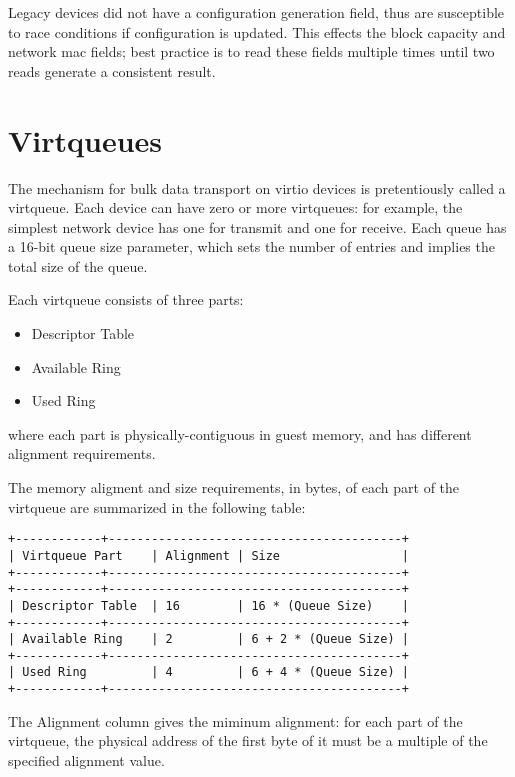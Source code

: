 Legacy devices did not have a configuration generation field, thus are
susceptible to race conditions if configuration is updated.  This
effects the block capacity and network mac fields; best practice is to
read these fields multiple times until two reads generate a consistent
result.

\section{Virtqueues}\label{sec:Basic Facilities of a Virtio Device / Virtqueues}

The mechanism for bulk data transport on virtio devices is
pretentiously called a virtqueue. Each device can have zero or more
virtqueues: for example, the simplest network device has one for
transmit and one for receive.  Each queue has a 16-bit queue size
parameter, which sets the number of entries and implies the total size
of the queue.

Each virtqueue consists of three parts:

\begin{itemize}
\item Descriptor Table

\item Available Ring

\item Used Ring
\end{itemize}

where each part is physically-contiguous in guest memory,
and has different alignment requirements.

The memory aligment and size requirements, in bytes, of each part of the
virtqueue are summarized in the following table:

\begin{verbatim}
+------------+-----------------------------------------+
| Virtqueue Part    | Alignment | Size                 |
+------------+-----------------------------------------+
+------------+-----------------------------------------+
| Descriptor Table  | 16        | 16 * (Queue Size)    |
+------------+-----------------------------------------+
| Available Ring    | 2         | 6 + 2 * (Queue Size) |
+------------+-----------------------------------------+
| Used Ring         | 4         | 6 + 4 * (Queue Size) |
+------------+-----------------------------------------+
\end{verbatim}

The Alignment column gives the miminum alignment: for each part
of the virtqueue, the physical address of the first byte of it
must be a multiple of the specified alignment value.

